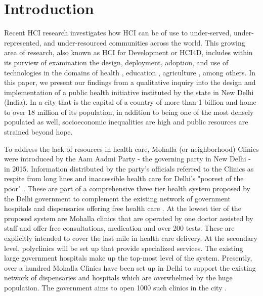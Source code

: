 \section{Introduction}
\begin{comment}
High level overview of the phenomenon you are studying. Should be something the reader can immediately get behind and hook themselves to. 
Now carry the reader through your flow. Draw their focus to the more narrow context in which you did your work.  
“In this paper, we focus on…” Give the high level description of your research.
“This paper is structured as follows.” Give the outline. When you mention the discussion, also mention the main findings of the discussion.
\end{comment}

Recent HCI research investigates how HCI can be of use to under-served, under-represented, and under-resourced communities across the world. This growing area of research, also known as HCI for Development or HCI4D, includes within its purview of examination the design, deployment, adoption, and use of technologies in the domains of health \cite{PH-CHI;TP}, education \cite{Kam}, agriculture \cite{Patel}, among others. In this paper, we present our findings from a qualitative inquiry into the design and implementation of a public health initiative instituted by the state in New Delhi (India). In a city that is the capital of a country of more than 1 billion and home to over 18 million of its population, in addition to being one of the most densely populated as well, socioeconomic inequalities are high and public resources are strained beyond hope. 

To address the lack of resources in health care, Mohalla (or neighborhood) Clinics were introduced by the Aam Aadmi Party - the governing party in New Delhi - in 2015. Information distributed by the party's officials referred to the Clinics as respite from long lines and inaccessible health care for Delhi's "poorest of the poor" \cite{AAPpressrelease}. These are part of a comprehensive three tier health system proposed by the Delhi government to complement the existing network of government hospitals and dispensaries offering free health care \cite{article}. At the lowest tier of the proposed system are Mohalla clinics that are operated by one doctor assisted by staff and offer free consultations, medication and over 200 tests. These are explicitly intended to cover the last mile in health care delivery. At the secondary level, polyclinics will be set up that provide specialized services. The existing large government hospitals make up the top-most level of the system. Presently, over a hundred Mohalla Clinics have been set up in Delhi to support the existing network of dispensaries and hospitals which are overwhelmed by the huge population. The government aims to open 1000 such clinics in the city \cite{?}.

